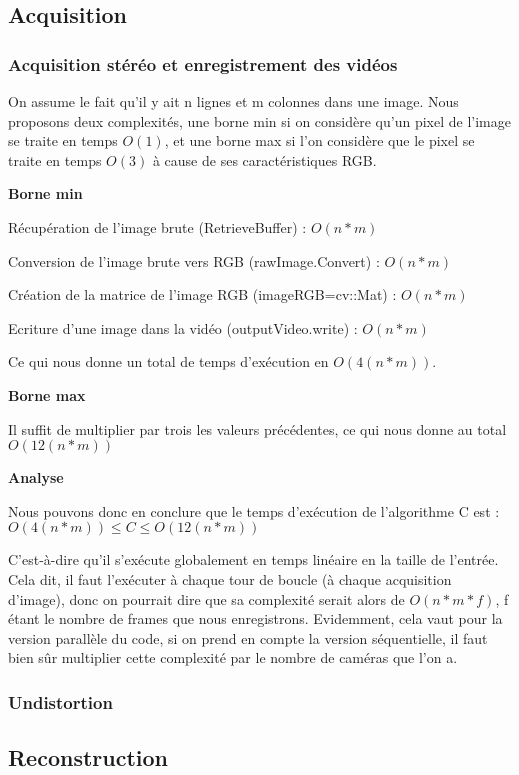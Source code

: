 \subsection{Acquisition}

\subsubsection{Acquisition stéréo et enregistrement des vidéos}

On assume le fait qu'il y ait n lignes et m colonnes dans une image. Nous proposons deux complexités, une borne min si on considère qu'un pixel de l'image se traite en temps $O(1)$, et une borne max si l'on considère que le pixel se traite en temps $O(3)$ à cause de ses caractéristiques RGB.

\textbf{Borne min}

Récupération de l'image brute (RetrieveBuffer) : $O(n*m)$

Conversion de l'image brute vers RGB (rawImage.Convert) : $O(n*m)$

Création de la matrice de l'image RGB (imageRGB=cv::Mat) : $O(n*m)$

Ecriture d'une image dans la vidéo (outputVideo.write) : $O(n*m)$

Ce qui nous donne un total de temps d'exécution en $O(4(n*m))$.

\textbf{Borne max}

Il suffit de multiplier par trois les valeurs précédentes, ce qui nous donne au total $O(12(n*m))$

\textbf{Analyse}

Nous pouvons donc en conclure que le temps d'exécution de l'algorithme C est :
$O(4(n*m)) \leq C \leq O(12(n*m))$

C'est-à-dire qu'il s'exécute globalement en temps linéaire en la taille de l'entrée. Cela dit, il faut l'exécuter à chaque tour de boucle (à chaque acquisition d'image), donc on pourrait dire que sa complexité serait alors de $O(n*m*f)$, f étant le nombre de frames que nous enregistrons. Evidemment, cela vaut pour la version parallèle du code, si on prend en compte la version séquentielle, il faut bien sûr multiplier cette complexité par le nombre de caméras que l'on a.

\subsubsection{Undistortion}

\subsection{Reconstruction}
